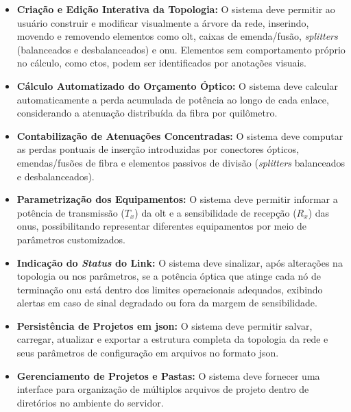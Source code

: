 \begin{itemize}
    \item \textbf{Criação e Edição Interativa da Topologia:} O sistema deve permitir ao usuário construir e modificar visualmente a árvore da rede, inserindo, movendo e removendo elementos como \gls{olt}, caixas de emenda/fusão, \textit{splitters} (balanceados e desbalanceados) e \gls{onu}. Elementos sem comportamento próprio no cálculo, como \glspl{cto}, podem ser identificados por anotações visuais.
    
    \item \textbf{Cálculo Automatizado do Orçamento Óptico:} O sistema deve calcular automaticamente a perda acumulada de potência ao longo de cada enlace, considerando a atenuação distribuída da fibra por quilômetro.
    
    \item \textbf{Contabilização de Atenuações Concentradas:} O sistema deve computar as perdas pontuais de inserção introduzidas por conectores ópticos, emendas/fusões de fibra e elementos passivos de divisão (\textit{splitters} balanceados e desbalanceados).
    
    \item \textbf{Parametrização dos Equipamentos:} O sistema deve permitir informar a potência de transmissão ($T_x$) da \gls{olt} e a sensibilidade de recepção ($R_x$) das \glspl{onu}, possibilitando representar diferentes equipamentos por meio de parâmetros customizados.
    
    \item \textbf{Indicação do \textit{Status} do Link:} O sistema deve sinalizar, após alterações na topologia ou nos parâmetros, se a potência óptica que atinge cada nó de terminação \gls{onu} está dentro dos limites operacionais adequados, exibindo alertas em caso de sinal degradado ou fora da margem de sensibilidade.
    
    \item \textbf{Persistência de Projetos em \gls{json}:} O sistema deve permitir salvar, carregar, atualizar e exportar a estrutura completa da topologia da rede e seus parâmetros de configuração em arquivos no formato \gls{json}.
    
    \item \textbf{Gerenciamento de Projetos e Pastas:} O sistema deve fornecer uma interface para organização de múltiplos arquivos de projeto dentro de diretórios no ambiente do servidor.
\end{itemize}

